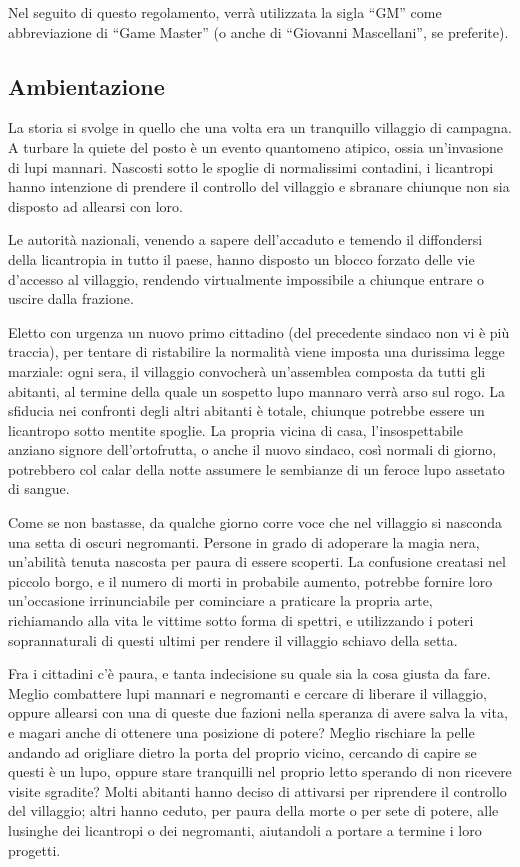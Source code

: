 \documentclass[a4paper,10pt]{article}
\begin{document}
Nel seguito di questo regolamento, verrà utilizzata la sigla ``GM'' come abbreviazione di ``Game Master'' (o anche di ``Giovanni Mascellani'', se preferite).

\subsection{Ambientazione}

La storia si svolge in quello che una volta era un tranquillo villaggio di campagna. A turbare la quiete del posto è un evento quantomeno atipico, ossia un'invasione di lupi mannari. Nascosti sotto le spoglie di normalissimi contadini, i licantropi hanno intenzione di prendere il controllo del villaggio e sbranare chiunque non sia disposto ad allearsi con loro.

Le autorità nazionali, venendo a sapere dell'accaduto e temendo il diffondersi della licantropia in tutto il paese, hanno disposto un blocco forzato delle vie d'accesso al villaggio, rendendo virtualmente impossibile a chiunque entrare o uscire dalla frazione.

Eletto con urgenza un nuovo primo cittadino (del precedente sindaco non vi è più traccia), per tentare di ristabilire la normalità viene imposta una durissima legge marziale: ogni sera, il villaggio convocherà un'assemblea composta da tutti gli abitanti, al termine della quale un sospetto lupo mannaro verrà arso sul rogo. La sfiducia nei confronti degli altri abitanti è totale, chiunque potrebbe essere un licantropo sotto mentite spoglie. La propria vicina di casa, l'insospettabile anziano signore dell'ortofrutta, o anche il nuovo sindaco, così normali di giorno, potrebbero col calar della notte assumere le sembianze di un feroce lupo assetato di sangue.

Come se non bastasse, da qualche giorno corre voce che nel villaggio si nasconda una setta di oscuri negromanti. Persone in grado di adoperare la magia nera, un'abilità tenuta nascosta per paura di essere scoperti. La confusione creatasi nel piccolo borgo, e il numero di morti in probabile aumento, potrebbe fornire loro un'occasione irrinunciabile per cominciare a praticare la propria arte, richiamando alla vita le vittime sotto forma di spettri, e utilizzando i poteri soprannaturali di questi ultimi per rendere il villaggio schiavo della setta.

Fra i cittadini c'è paura, e tanta indecisione su quale sia la cosa giusta da fare. Meglio combattere lupi mannari e negromanti e cercare di liberare il villaggio, oppure allearsi con una di queste due fazioni nella speranza di avere salva la vita, e magari anche di ottenere una posizione di potere? Meglio rischiare la pelle andando ad origliare dietro la porta del proprio vicino, cercando di capire se questi è un lupo, oppure stare tranquilli nel proprio letto sperando di non ricevere visite sgradite? Molti abitanti hanno deciso di attivarsi per riprendere il controllo del villaggio; altri hanno ceduto, per paura della morte o per sete di potere, alle lusinghe dei licantropi o dei negromanti, aiutandoli a portare a termine i loro progetti.
\end{document}
